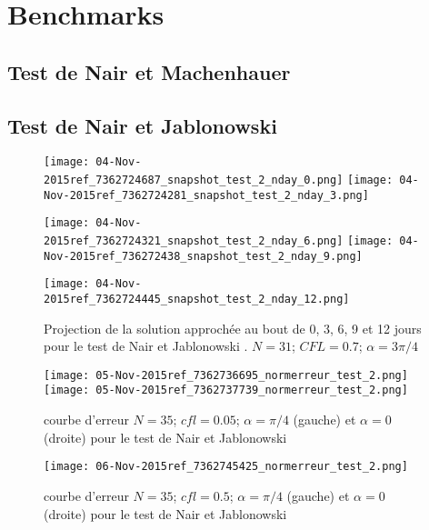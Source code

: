 \section{Benchmarks}

\subsection{Test de Nair et Machenhauer}

\subsection{Test de Nair et Jablonowski}

\begin{figure}[H]
\texttt{[image: 04-Nov-2015ref\_7362724687\_snapshot\_test\_2\_nday\_0.png]}
\texttt{[image: 04-Nov-2015ref\_7362724281\_snapshot\_test\_2\_nday\_3.png]}

\texttt{[image: 04-Nov-2015ref\_7362724321\_snapshot\_test\_2\_nday\_6.png]}
\texttt{[image: 04-Nov-2015ref\_736272438\_snapshot\_test\_2\_nday\_9.png]}

\texttt{[image: 04-Nov-2015ref\_7362724445\_snapshot\_test\_2\_nday\_12.png]}
\caption{Projection de la solution approchée au bout de 0, 3, 6, 9 et 12 jours pour le test de Nair et Jablonowski \cite{Nair2008}. $N=31$; $CFL = 0.7$; $\alpha = 3 \pi / 4$}
\label{SNAPSHOT}
\end{figure}



\begin{figure}[H]
\texttt{[image: 05-Nov-2015ref\_7362736695\_normerreur\_test\_2.png]}
\texttt{[image: 05-Nov-2015ref\_7362737739\_normerreur\_test\_2.png]}
\label{erreur_cfl=0.05}
\caption{courbe d'erreur $N=35$; $cfl=0.05$; $\alpha = \pi / 4$ (gauche) et $\alpha = 0$ (droite) pour le test de Nair et Jablonowski \cite{Nair2008}}
\end{figure}



\begin{figure}[H]
\texttt{[image: 06-Nov-2015ref\_7362745425\_normerreur\_test\_2.png]}
\label{erreur_cfl=0.5}
\caption{courbe d'erreur $N=35$; $cfl=0.5$; $\alpha = \pi / 4$ (gauche) et $\alpha = 0$ (droite) pour le test de Nair et Jablonowski \cite{Nair2008}}
\end{figure}




